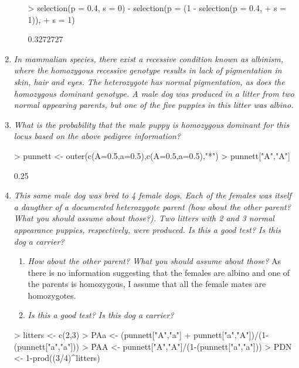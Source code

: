\documentclass[12pt,a4paper]{paper}
\begin{document}
\begin{enumerate}
\begin{itemize}
\begin{Schunk}
\begin{Sinput}
> selection(p = 0.4, s = 0) - selection(p = (1 - selection(p = 0.4,
+                                                          s = 1)),
+                                       s = 1)
\end{Sinput}
\begin{Soutput}
[1] 0.3272727
\end{Soutput}
\end{Schunk}
\end{itemize}
\item[] \emph{In mammalian species, there exist a recessive condition known as albinism, where the homozygous recessive genotype results in lack of pigmentation in skin, hair and eyes. The heterozygote has normal pigmentation, as does the homozygous dominant genotype. A male dog was produced in a litter from two normal appearing parents, but one of the five puppies in this litter was albino.}
\item \emph{What is the probability that the male puppy is homozygous dominant for this locus based on the above pedigree information?}
\begin{Schunk}
\begin{Sinput}
> punnett <- outer(c(A=0.5,a=0.5),c(A=0.5,a=0.5),"*")
> punnett["A","A"]
\end{Sinput}
\begin{Soutput}
[1] 0.25
\end{Soutput}
\end{Schunk}
\item \emph{This same male dog was bred to 4 female dogs. Each of the females was itself a daugther of a documented heterozygote parent (how about the other parent? What you should assume about those?). Two litters with 2 and 3 normal appearance puppies, respectively, were produced. Is this a good test? Is this dog a carrier?}
\begin{enumerate}
\item \emph{How about the other parent? What you should assume about those?} As there is no information suggesting that the females are albino and one of the parents is homozygous, I assume that all the female mates are homozygotes.
\item \emph{Is this a good test? Is this dog a carrier?}
\end{enumerate}
\begin{Schunk}
\begin{Sinput}
> litters <- c(2,3)
> PAa <- (punnett["A","a"] + punnett["a","A"])/(1-(punnett["a","a"]))
> PAA <- punnett["A","A"]/(1-(punnett["a","a"]))
> PDN <- 1-prod((3/4)^litters)

\end{Sinput}
\end{Schunk}
\end{enumerate}
\end{document}
